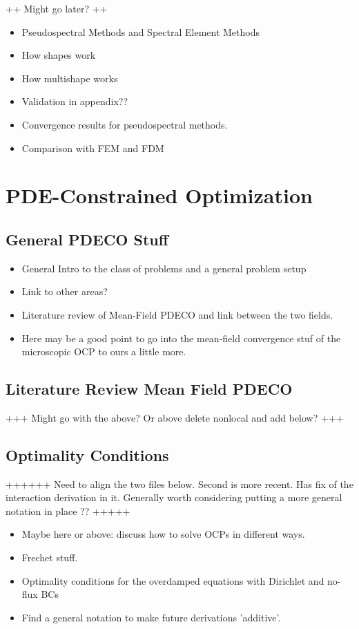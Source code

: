 \documentclass[11pt, a4paper]{article}
\theoremstyle{definition}
\begin{document}
	++ Might go later? ++
	\begin{itemize}
		\item Pseudospectral Methods and Spectral Element Methods
		\item How shapes work
		\item How multishape works
		\item Validation in appendix??
		\item Convergence results for pseudospectral methods.
		\item Comparison with FEM and FDM
	\end{itemize}
	
		
    
    
    
    
    
    
	\section{PDE-Constrained Optimization}
	
	\subsection{General PDECO Stuff}
		\begin{itemize}
			\item General Intro to the class of problems and a general problem setup
			\item Link to other areas?
			\item Literature review of Mean-Field PDECO and link between the two fields.
			\item Here may be a good point to go into the mean-field convergence stuf of the microscopic OCP to ours a little more.
		\end{itemize}
	
	
	\subsection{Literature Review Mean Field PDECO}
	+++ Might go with the above? Or above delete nonlocal and add below? +++
	
	
	\subsection{Optimality Conditions}
	++++++ Need to align the two files below. Second is more recent. Has fix of the interaction derivation in it. Generally worth considering putting a more general notation in place ?? +++++
		\begin{itemize}
			\item Maybe here or above: discuss how to solve OCPs in different ways.
			\item Frechet stuff.
			\item Optimality conditions for the overdamped equations with Dirichlet and no-flux BCs
			\item Find a general notation to make future derivations 'additive'.
		\end{itemize}
	
	
	
\end{document}
